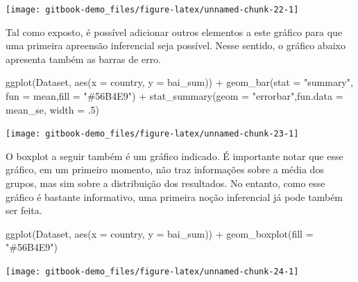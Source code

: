 \documentclass[
]{book}
\newenvironment{Shaded}{\begin{snugshade}}{\end{snugshade}}
\newcommand{\AttributeTok}[1]{\textcolor[rgb]{0.77,0.63,0.00}{#1}}
\newcommand{\DecValTok}[1]{\textcolor[rgb]{0.00,0.00,0.81}{#1}}
\newcommand{\FunctionTok}[1]{\textcolor[rgb]{0.00,0.00,0.00}{#1}}
\newcommand{\NormalTok}[1]{#1}
\newcommand{\SpecialCharTok}[1]{\textcolor[rgb]{0.00,0.00,0.00}{#1}}
\newcommand{\StringTok}[1]{\textcolor[rgb]{0.31,0.60,0.02}{#1}}
\begin{document}
\begin{center}\texttt{[image: gitbook-demo\_files/figure-latex/unnamed-chunk-22-1]} \end{center}

Tal como exposto, é possível adicionar outros elementos a este gráfico para que uma primeira apreensão inferencial seja possível. Nesse sentido, o gráfico abaixo apresenta também as barras de erro.

\begin{Shaded}
\begin{Highlighting}[]
\FunctionTok{ggplot}\NormalTok{(Dataset, }\FunctionTok{aes}\NormalTok{(}\AttributeTok{x =}\NormalTok{ country, }\AttributeTok{y =}\NormalTok{ bai\_sum)) }\SpecialCharTok{+}
  \FunctionTok{geom\_bar}\NormalTok{(}\AttributeTok{stat =} \StringTok{"summary"}\NormalTok{, }\AttributeTok{fun =}\NormalTok{ mean,}\AttributeTok{fill =} \StringTok{"\#56B4E9"}\NormalTok{) }\SpecialCharTok{+}
  \FunctionTok{stat\_summary}\NormalTok{(}\AttributeTok{geom =} \StringTok{"errorbar"}\NormalTok{,}\AttributeTok{fun.data =}\NormalTok{ mean\_se, }\AttributeTok{width =}\NormalTok{ .}\DecValTok{5}\NormalTok{) }
\end{Highlighting}
\end{Shaded}

\begin{center}\texttt{[image: gitbook-demo\_files/figure-latex/unnamed-chunk-23-1]} \end{center}

O boxplot a seguir também é um gráfico indicado. É importante notar que esse gráfico, em um primeiro momento, não traz informações sobre a média dos grupos, mas sim sobre a distribuição dos resultados. No entanto, como esse gráfico é bastante informativo, uma primeira noção inferencial já pode também ser feita.

\begin{Shaded}
\begin{Highlighting}[]
\FunctionTok{ggplot}\NormalTok{(Dataset, }\FunctionTok{aes}\NormalTok{(}\AttributeTok{x =}\NormalTok{ country, }\AttributeTok{y =}\NormalTok{ bai\_sum)) }\SpecialCharTok{+}
  \FunctionTok{geom\_boxplot}\NormalTok{(}\AttributeTok{fill =} \StringTok{"\#56B4E9"}\NormalTok{)}
\end{Highlighting}
\end{Shaded}

\begin{center}\texttt{[image: gitbook-demo\_files/figure-latex/unnamed-chunk-24-1]} \end{center}
\end{document}
